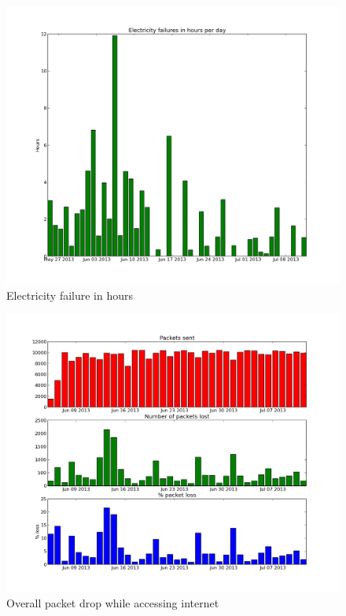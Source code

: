 \documentclass[10pt]{sensys-proc}
\begin{document}
\begin{figure}     
    \includegraphics[scale=0.30]{./figures/electricity.png}    
    \caption{Electricity failure in hours}   
    \label{fig:failure_hours}   
\end{figure}

\begin{figure}     
    \includegraphics[scale=0.30]{./figures/network.png}    
    \caption{Overall packet drop while accessing internet}   
    \label{fig:network}   
\end{figure}
\end{document}
